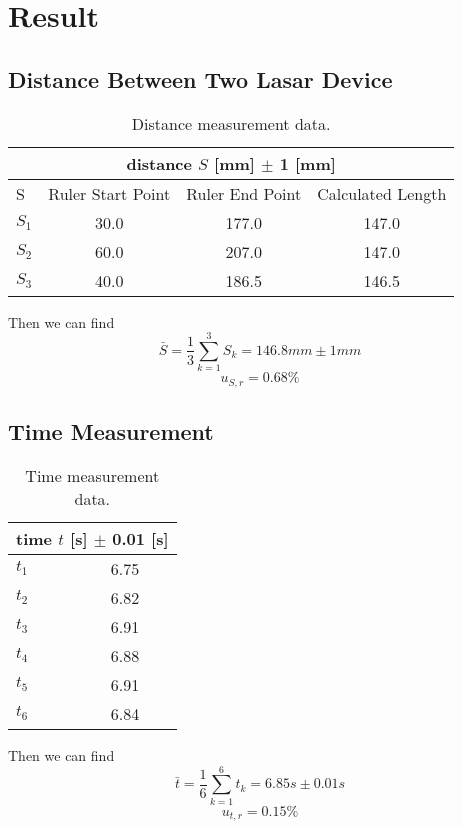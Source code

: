 \section{Result}
\subsection{Distance Between Two Lasar Device}

\begin{table}[H]
  \centering
  \begin{tabular}{|l|c |c |c |}
    \hline
    \multicolumn{4}{|c|}{distance $S$ [mm] $\pm$ 1 [mm]} \\
    \hline
    S &  Ruler Start Point & Ruler End Point & Calculated Length \\
    \hline
    $S_1$ & 30.0 & 177.0 & 147.0 \\ 
    \hline
    $S_2$ & 60.0 & 207.0 & 147.0 \\ 
    \hline
    $S_3$ & 40.0 & 186.5 & 146.5 \\ 
    \hline
  \end{tabular}
  \caption{Distance measurement data.}
\end{table}

Then we can find
$$  \bar{S} = \frac{1}{3} \sum_{k=1}^{3} S_k = 146.8 mm \pm 1 mm   $$
$$  u_{S,r} = 0.68 \%  $$ 


\subsection{Time Measurement}

\begin{table}[H]
  \centering
  \begin{tabular}{|l|c|}
    \hline
    \multicolumn{2}{|c|}{time $t$ [s] $\pm$ 0.01 [s] } \\
    \hline
    $t_1$ & 6.75 \\
    \hline
    $t_2$ & 6.82 \\
    \hline
    $t_3$ & 6.91 \\
    \hline
    $t_4$ & 6.88 \\
    \hline
    $t_5$ & 6.91 \\
    \hline
    $t_6$ & 6.84 \\
    \hline
  \end{tabular}
  \caption{Time measurement data.}
\end{table}


Then we can find
$$  \bar{t} = \frac{1}{6} \sum_{k=1}^{6} t_k =6.85 s \pm 0.01 s   $$
$$  u_{t,r} = 0.15 \%  $$ 

